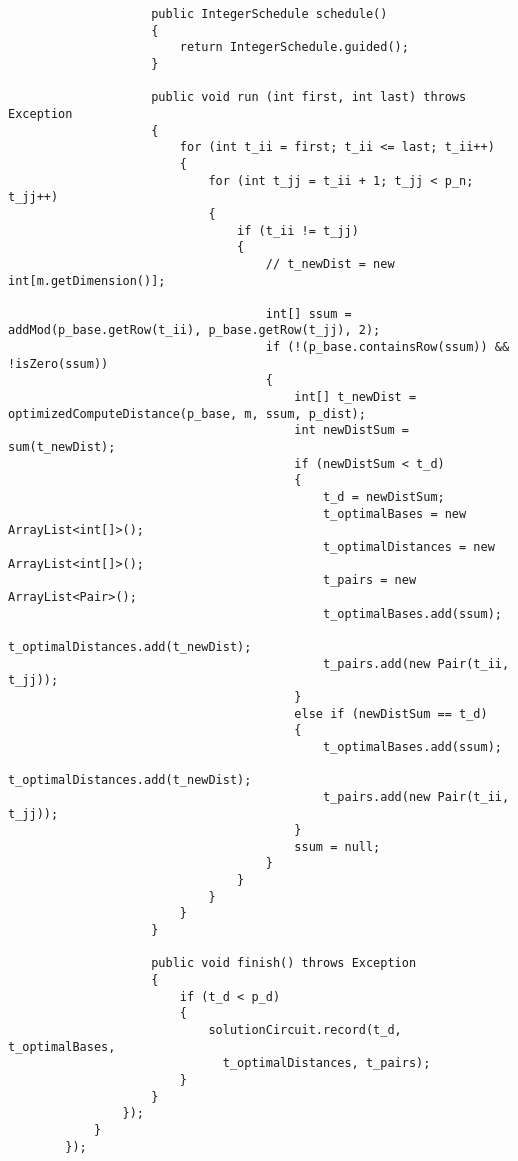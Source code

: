 \begin{verbatim}
                    public IntegerSchedule schedule()
                    {
                        return IntegerSchedule.guided();
                    }

                    public void run (int first, int last) throws Exception
                    {
                        for (int t_ii = first; t_ii <= last; t_ii++)
                        {
                            for (int t_jj = t_ii + 1; t_jj < p_n; t_jj++)
                            {
                                if (t_ii != t_jj)
                                {
                                    // t_newDist = new int[m.getDimension()];

                                    int[] ssum = addMod(p_base.getRow(t_ii), p_base.getRow(t_jj), 2);
                                    if (!(p_base.containsRow(ssum)) && !isZero(ssum))
                                    {
                                        int[] t_newDist = optimizedComputeDistance(p_base, m, ssum, p_dist);
                                        int newDistSum = sum(t_newDist);
                                        if (newDistSum < t_d)
                                        {
                                            t_d = newDistSum;
                                            t_optimalBases = new ArrayList<int[]>();
                                            t_optimalDistances = new ArrayList<int[]>();
                                            t_pairs = new ArrayList<Pair>();
                                            t_optimalBases.add(ssum);
                                            t_optimalDistances.add(t_newDist);
                                            t_pairs.add(new Pair(t_ii, t_jj));
                                        }
                                        else if (newDistSum == t_d)
                                        {
                                            t_optimalBases.add(ssum);
                                            t_optimalDistances.add(t_newDist);
                                            t_pairs.add(new Pair(t_ii, t_jj));
                                        }
                                        ssum = null;
                                    }   
                                }
                            }
                        }
                    }

                    public void finish() throws Exception
                    {
                        if (t_d < p_d)
                        {
                            solutionCircuit.record(t_d, t_optimalBases, 
                              t_optimalDistances, t_pairs);
                        }
                    }
                });
            }
        });


\end{verbatim}
